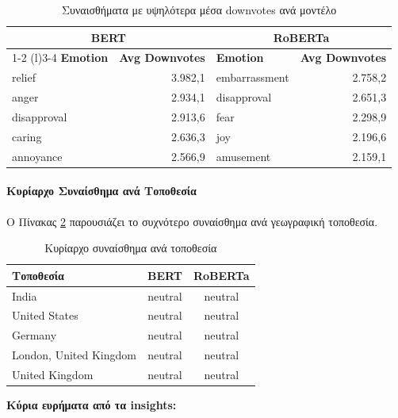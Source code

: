 \documentclass[a4paper,11pt,oneside,openany]{ioniothesis}
\begin{document}
\begin{table}[H]
\centering
\caption{Συναισθήματα με υψηλότερα μέσα downvotes ανά μοντέλο}
\label{tab:emotions_downvotes}
\begin{tabular}{@{}lrlr@{}}
\toprule
\multicolumn{2}{c}{\textbf{BERT}} & \multicolumn{2}{c}{\textbf{RoBERTa}} \\
\cmidrule(r){1-2} \cmidrule(l){3-4}
\textbf{Emotion} & \textbf{Avg Downvotes} & \textbf{Emotion} & \textbf{Avg Downvotes} \\
\midrule
relief & 3.982,1 & embarrassment & 2.758,2 \\
anger & 2.934,1 & disapproval & 2.651,3 \\
disapproval & 2.913,6 & fear & 2.298,9 \\
caring & 2.636,3 & joy & 2.196,6 \\
annoyance & 2.566,9 & amusement & 2.159,1 \\
\bottomrule
\end{tabular}
\end{table}

\paragraph{Κυρίαρχο Συναίσθημα ανά Τοποθεσία}

Ο Πίνακας \ref{tab:emotion_location} παρουσιάζει το συχνότερο συναίσθημα ανά γεωγραφική τοποθεσία.

\begin{table}[H]
\centering
\caption{Κυρίαρχο συναίσθημα ανά τοποθεσία}
\label{tab:emotion_location}
\begin{tabular}{@{}lcc@{}}
\toprule
\textbf{Τοποθεσία} & \textbf{BERT} & \textbf{RoBERTa} \\
\midrule
India & neutral & neutral \\
United States & neutral & neutral \\
Germany & neutral & neutral \\
London, United Kingdom & neutral & neutral \\
United Kingdom & neutral & neutral \\
\bottomrule
\end{tabular}
\end{table}

\textbf{Κύρια ευρήματα από τα insights:}
\end{document}
